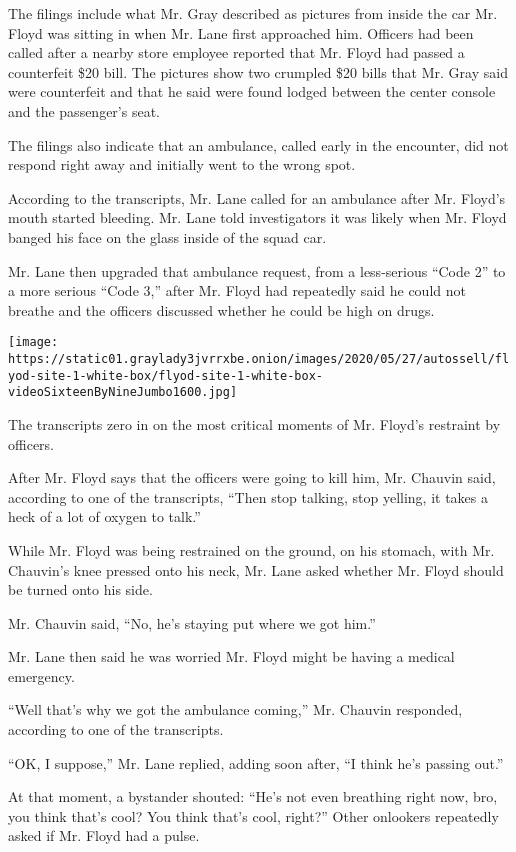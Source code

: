 The filings include what Mr. Gray described as pictures from inside the
car Mr. Floyd was sitting in when Mr. Lane first approached him.
Officers had been called after a nearby store employee reported that Mr.
Floyd had passed a counterfeit \$20 bill. The pictures show two crumpled
\$20 bills that Mr. Gray said were counterfeit and that he said were
found lodged between the center console and the passenger's seat.

The filings also indicate that an ambulance, called early in the
encounter, did not respond right away and initially went to the wrong
spot.

According to the transcripts, Mr. Lane called for an ambulance after Mr.
Floyd's mouth started bleeding. Mr. Lane told investigators it was
likely when Mr. Floyd banged his face on the glass inside of the squad
car.

Mr. Lane then upgraded that ambulance request, from a less-serious
``Code 2'' to a more serious ``Code 3,'' after Mr. Floyd had repeatedly
said he could not breathe and the officers discussed whether he could be
high on drugs.

\texttt{[image: https://static01.graylady3jvrrxbe.onion/images/2020/05/27/autossell/flyod-site-1-white-box/flyod-site-1-white-box-videoSixteenByNineJumbo1600.jpg]}

The transcripts zero in on the most critical moments of Mr. Floyd's
restraint by officers.

After Mr. Floyd says that the officers were going to kill him, Mr.
Chauvin said, according to one of the transcripts, ``Then stop talking,
stop yelling, it takes a heck of a lot of oxygen to talk.''

While Mr. Floyd was being restrained on the ground, on his stomach, with
Mr. Chauvin's knee pressed onto his neck, Mr. Lane asked whether Mr.
Floyd should be turned onto his side.

Mr. Chauvin said, ``No, he's staying put where we got him.''

Mr. Lane then said he was worried Mr. Floyd might be having a medical
emergency.

``Well that's why we got the ambulance coming,'' Mr. Chauvin responded,
according to one of the transcripts.

``OK, I suppose,'' Mr. Lane replied, adding soon after, ``I think he's
passing out.''

At that moment, a bystander shouted: ``He's not even breathing right
now, bro, you think that's cool? You think that's cool, right?'' Other
onlookers repeatedly asked if Mr. Floyd had a pulse.

